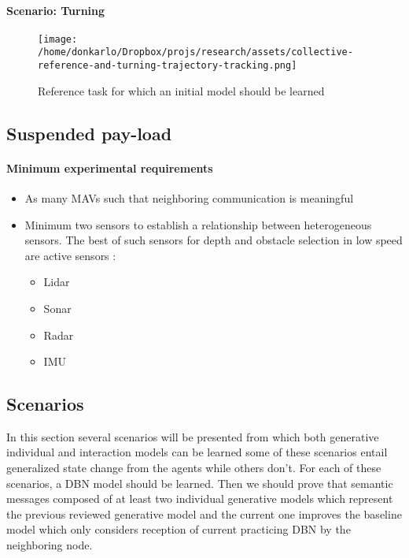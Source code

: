 \documentclass{article}
\begin{document}
			\paragraph{Scenario: Turning}
				\begin{figure*}
					\centering
					\texttt{[image: /home/donkarlo/Dropbox/projs/research/assets/collective-reference-and-turning-trajectory-tracking.png]}
					\caption{Reference task for which an initial model should be learned}
					\label{fig:collective-reference-and-turning-trajectory-tracking}
				\end{figure*}
		
		\subsection{Suspended pay-load}
			\paragraph{Minimum experimental requirements}
				\begin{itemize}
					\item As many MAVs such that neighboring communication is meaningful
					\item Minimum two sensors to establish a relationship between heterogeneous sensors. The best of such sensors for depth and obstacle selection in low speed are active sensors \citep{apatean-2007-sensors-for-obstacle-detection-a-survey}: 
				  	\begin{itemize}
						\item Lidar
						\item Sonar
						\item Radar
						\item IMU
				  	\end{itemize}
			  	\end{itemize}
			\subsection{Scenarios} \label{experimental-scenarios}
				In this section several scenarios will be presented from which both generative individual and interaction models can be learned some of these scenarios entail generalized state change from the agents while others don't. For each of these scenarios, a DBN model should be learned. Then we should prove that semantic messages composed of at least two individual generative models which represent the previous reviewed generative model and the current one improves the baseline model which only considers reception of current practicing DBN by the neighboring node.
				
\end{document}
